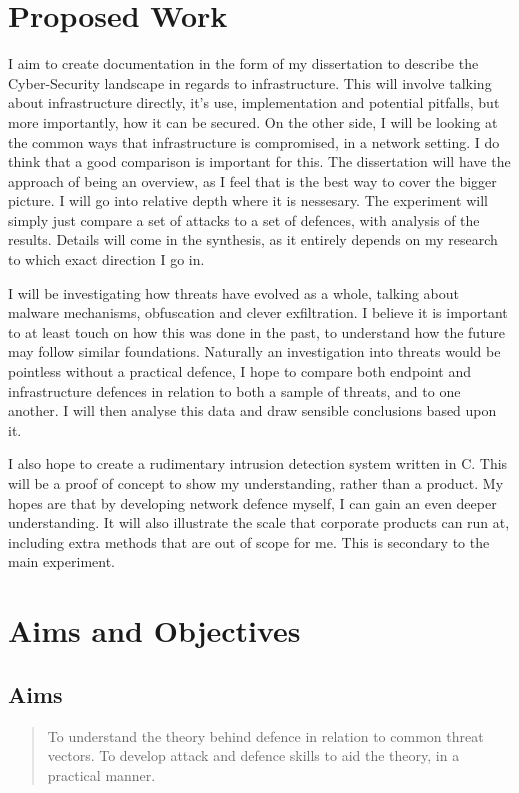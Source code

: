 \section{Proposed Work}
\label{proposed}
I aim to create documentation in the form of my dissertation to describe the Cyber-Security landscape in regards to infrastructure. 
This will involve talking about infrastructure directly, it's use, implementation and potential pitfalls, but more importantly, how it can be secured.
On the other side, I will be looking at the common ways that infrastructure is compromised, in a network setting. 
I do think that a good comparison is important for this. The dissertation will have the approach of being an overview, as I feel that is the best way to cover the bigger picture. 
I will go into relative depth where it is nessesary. The experiment will simply just compare a set of attacks to a set of defences, with analysis of the results. Details will come in the synthesis, as
it entirely depends on my research to which exact direction I go in. 

I will be investigating how threats have evolved as a whole, talking about malware mechanisms, obfuscation and clever exfiltration. 
I believe it is important to at least touch on how this was done in the past, 
to understand how the future may follow similar foundations. Naturally an investigation into threats would be pointless without a practical defence, 
I hope to compare both endpoint and infrastructure defences in relation to both a sample of threats, and to one another. I will then analyse this data and draw sensible conclusions based upon it.

I also hope to create a rudimentary intrusion detection system written in C. This will be a proof of concept to show my understanding, rather than a product. My hopes are that by developing network defence myself, 
I can gain an even deeper understanding. It will also illustrate the scale that corporate products can run at, including extra methods that are out of scope for me.
This is secondary to the main experiment. 

\section{Aims and Objectives}
\subsection{Aims}
\begin{quote}
	To understand the theory behind defence in relation to common threat vectors.
	To develop attack and defence skills to aid the theory, in a practical manner.
\end{quote}

